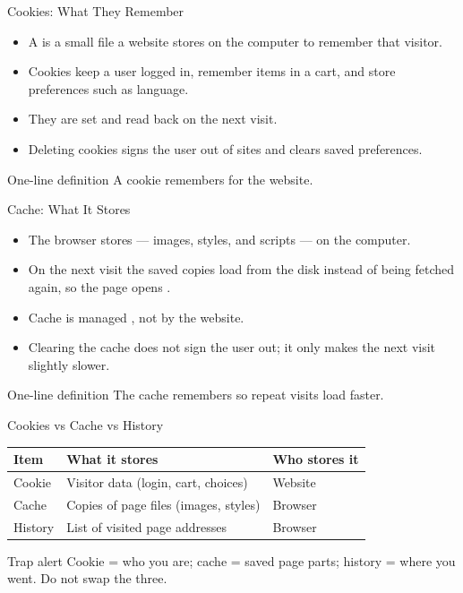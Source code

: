 \documentclass[aspectratio=169]{beamer}
\begin{document}
\begin{frame}{Cookies: What They Remember}
  \begin{itemize}
    \item A  is a small file a website stores on the computer to
      remember that visitor.
    \item Cookies keep a user logged in, remember items in a cart, and store
      preferences such as language.
    \item They are set  and read back on the next visit.
    \item Deleting cookies signs the user out of sites and clears saved
      preferences.
  \end{itemize}
  \begin{block}{One-line definition}
    A cookie remembers  for the website.
  \end{block}
\end{frame}

\begin{frame}{Cache: What It Stores}
  \begin{itemize}
    \item The browser  stores  ---
      images, styles, and scripts --- on the computer.
    \item On the next visit the saved copies load from the disk instead of
      being fetched again, so the page opens .
    \item Cache is managed , not by the website.
    \item Clearing the cache does not sign the user out; it only makes the
      next visit slightly slower.
  \end{itemize}
  \begin{block}{One-line definition}
    The cache remembers  so repeat visits load faster.
  \end{block}
\end{frame}

\begin{frame}{Cookies vs Cache vs History}
  \begin{center}
    \begin{tabular}{lll}
      \toprule
      \textbf{Item} & \textbf{What it stores} & \textbf{Who stores it} \\
      \midrule
      Cookie & Visitor data (login, cart, choices) & Website \\
      Cache & Copies of page files (images, styles) & Browser \\
      History & List of visited page addresses & Browser \\
      \bottomrule
    \end{tabular}
  \end{center}
  \vspace{0.3cm}
  \begin{alertblock}{Trap alert}
    Cookie = who you are; cache = saved page parts; history = where you went.
    Do not swap the three.
  \end{alertblock}
\end{frame}
\end{document}
